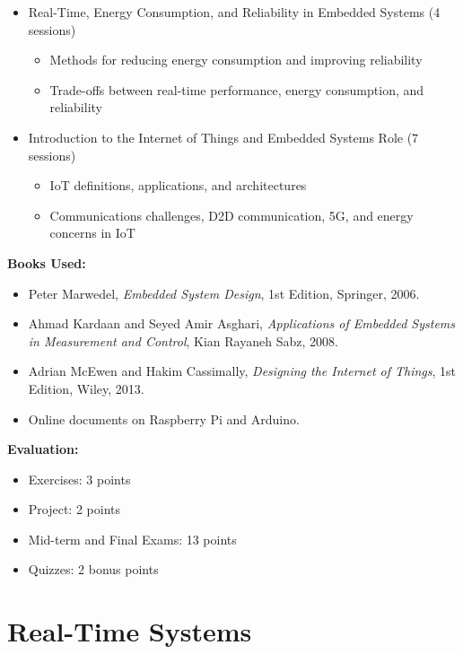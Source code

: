 \documentclass[12pt]{article}
\begin{document}
\begin{itemize}
\begin{itemize}
    \end{itemize}
    \item Real-Time, Energy Consumption, and Reliability in Embedded Systems (4 sessions)
    \begin{itemize}
        \item Methods for reducing energy consumption and improving reliability
        \item Trade-offs between real-time performance, energy consumption, and reliability
    \end{itemize}
    \item Introduction to the Internet of Things and Embedded Systems Role (7 sessions)
    \begin{itemize}
        \item IoT definitions, applications, and architectures
        \item Communications challenges, D2D communication, 5G, and energy concerns in IoT
    \end{itemize}
    
\end{itemize}

\textbf{Books Used:}
\begin{itemize}
    \item Peter Marwedel, \textit{Embedded System Design}, 1st Edition, Springer, 2006.
    \item Ahmad Kardaan and Seyed Amir Asghari, \textit{Applications of Embedded Systems in Measurement and Control}, Kian Rayaneh Sabz, 2008.
    \item Adrian McEwen and Hakim Cassimally, \textit{Designing the Internet of Things}, 1st Edition, Wiley, 2013.
    \item Online documents on Raspberry Pi and Arduino.
\end{itemize}

\textbf{Evaluation:}
\begin{itemize}
    \item Exercises: 3 points
    \item Project: 2 points
    \item Mid-term and Final Exams: 13 points
    \item Quizzes: 2 bonus points
\end{itemize}


\newpage

\section{Real-Time Systems}
\end{document}
